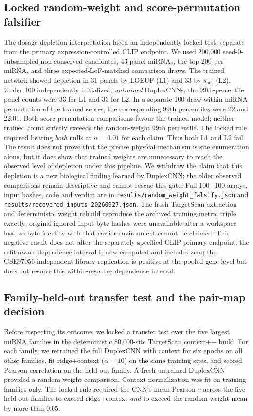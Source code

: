 \documentclass[11pt]{article}
\begin{document}
\subsection{Locked random-weight and score-permutation falsifier}
The dosage-depletion interpretation faced an independently locked test, separate
from the primary expression-controlled CLIP endpoint. We used 200{,}000
seed-0-subsampled non-conserved candidates, 43-panel miRNAs, the top 200 per
miRNA, and three expected-LoF-matched comparison draws. The trained network
showed depletion in 31 panels by LOEUF (L1) and 33 by $s_\mathrm{het}$ (L2).
Under 100 independently initialized, \emph{untrained} DuplexCNNs, the
99th-percentile panel counts were 33 for L1 and 33 for L2. In a separate
100-draw within-miRNA permutation of the trained scores, the corresponding
99th percentiles were 22 and 22.01. Both score-permutation comparisons favour
the trained model; neither trained count strictly exceeds the random-weight
99th percentile. The locked rule required beating \emph{both} nulls at
$\alpha=0.01$ for each claim. Thus both L1 and L2 fail. The result does not
prove that the precise physical mechanism is site enumeration alone, but it
does show that trained weights are unnecessary to reach the observed level of
depletion under this pipeline. We withdraw the claim that this depletion is a
new biological finding learned by DuplexCNN; the older observed comparisons
remain descriptive and cannot rescue this gate. Full 100+100 arrays, input
hashes, code and verdict are in
\texttt{results/random\_weight\_falsify.json} and
\texttt{results/recovered\_inputs\_20260927.json}. The fresh TargetScan
extraction and deterministic weight rebuild reproduce the archived training
metric triple exactly; original ignored-input byte hashes were unavailable
after a workspace loss, so byte identity with that earlier environment cannot
be claimed. This negative result does not alter the separately specified
CLIP primary endpoint; the refit-aware dependence interval is now computed
and includes zero; the GSE97056 independent-library replication is positive at the pooled gene level but does not resolve this within-resource dependence interval.

\subsection{Family-held-out transfer test and the pair-map decision}
Before inspecting its outcome, we locked a transfer test over the five largest
miRNA families in the deterministic 80{,}000-site TargetScan context++ build.
For each family, we retrained the full DuplexCNN with context for six epochs on
all other families, fit ridge+context ($\alpha=10$) on the same training sites,
and scored Pearson correlation on the held-out family. A fresh untrained
DuplexCNN provided a random-weight comparison. Context normalization was
fit on training families only. The locked rule required the CNN's mean Pearson
$r$ across the five held-out families to exceed ridge+context \emph{and} to
exceed the random-weight mean by more than $0.05$.
\end{document}
